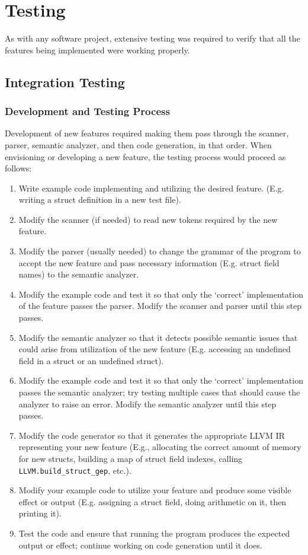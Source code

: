 \chapter{Testing}
  As with any software project, extensive testing was required to verify that all the features being implemented were working properly. 

\section{Integration Testing}

    \subsection{Development and Testing Process}
    Development of new features required making them pass through the scanner, parser, semantic analyzer, and then code generation, in that order. When envisioning or developing a new feature, the testing process would proceed as follows:
    
    \begin{enumerate}
      \item Write example code implementing and utilizing the desired feature. (E.g. writing a struct definition in a new test file).
      \item Modify the scanner (if needed) to read new tokens required by the new feature.
      \item Modify the parser (usually needed) to change the grammar of the program to accept the new feature and pass necessary information (E.g. struct field names) to the semantic analyzer.
      \item Modify the example code and test it so that only the `correct' implementation of the feature passes the parser. Modify the scanner and parser until this step passes.
      \item Modify the semantic analyzer so that it detects possible semantic issues that could arise from utilization of the new feature (E.g. accessing an undefined field in a struct or an undefined struct).
      \item Modify the example code and test it so that only the `correct' implementation passes the semantic analyzer; try testing multiple cases that should cause the analyzer to raise an error. Modify the semantic analyzer until this step passes.
      \item Modify the code generator so that it generates the appropriate LLVM IR representing your new feature (E.g., allocating the correct amount of memory for new structs, building a map of struct field indexes, calling \texttt{LLVM.build\_struct\_gep}, etc.).
      \item Modify your example code to utilize your feature and produce some visible effect or output (E.g. assigning a struct field, doing arithmetic on it, then printing it).
      \item Test the code and ensure that running the program produces the expected output or effect; continue working on code generation until it does.
    \end{enumerate}
    
